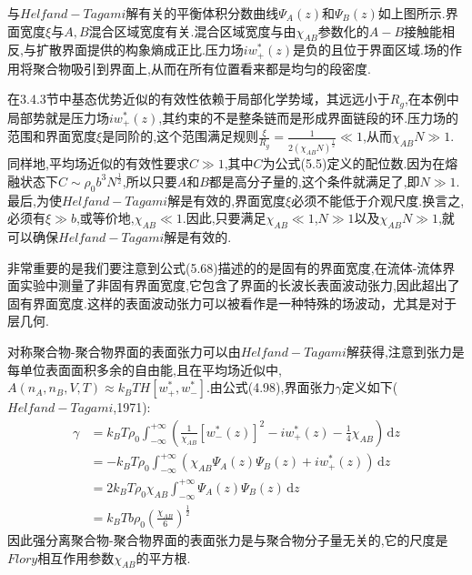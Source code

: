 与$Helfand−Tagami$解有关的平衡体积分数曲线$\Psi_{A}(z)$和$\Psi_{B}(z)$如上图所示.界面宽度$\xi$与$A,B$混合区域宽度有关.混合区域宽度与由$\chi_{AB}$参数化的$A−B$接触能相反,与扩散界面提供的构象熵成正比.压力场$iw_+^*(z)$是负的且位于界面区域.场的作用将聚合物吸引到界面上,从而在所有位置看来都是均匀的段密度.

在3.4.3节中基态优势近似的有效性依赖于局部化学势域，其远远小于$R_g$,在本例中局部势就是压力场$iw_+^*(z)$,其约束的不是整条链而是形成界面链段的环.压力场的范围和界面宽度$\xi$是同阶的,这个范围满足规则$\frac{\xi}{R_g} =\frac{1}{2(\chi_{AB}N)^{\frac{1}{2}}}\ll1$,从而$\chi_{AB}N\gg1$.同样地,平均场近似的有效性要求$C\gg1$,其中$C$为公式(5.5)定义的配位数.因为在熔融状态下$C\sim\rho_0b^3N^{\frac{1}{2}}$,所以只要$A$和$B$都是高分子量的,这个条件就满足了,即$N\gg1$.最后,为使$Helfand−Tagami$解是有效的,界面宽度$\xi $必须不能低于介观尺度.换言之,必须有$\xi \gg b$,或等价地,$\chi_{AB}\ll1$.因此,只要满足$\chi_{AB}\ll1$,$N\gg1$以及$\chi_{AB}N\gg1$,就可以确保$Helfand−Tagami$解是有效的.
	
非常重要的是我们要注意到公式(5.68)描述的的是固有的界面宽度,在流体-流体界面实验中测量了非固有界面宽度,它包含了界面的长波长表面波动张力,因此超出了固有界面宽度.这样的表面波动张力可以被看作是一种特殊的场波动，尤其是对于层几何.

对称聚合物-聚合物界面的表面张力可以由$Helfand−Tagami$解获得,注意到张力是每单位表面面积多余的自由能,且在平均场近似中,$A(n_A,n_B,V,T)\approx k_BTH[w_+^*,w_-^*]$.由公式(4.98),界面张力$\gamma$定义如下($Helfand−Tagami$,1971):
\begin{equation}
\begin{aligned}
\gamma&=k_B T \rho_0\int_{-\infty}^{+\infty}(\frac{1}{\chi_{AB}}[w_-^*(z)]^2-iw_+^*(z)-\frac{1}{4}\chi_{AB})\,\mathrm{d}z\\
&=-k_B T \rho_0\int_{-\infty}^{+\infty}(\chi_{AB}\Psi_{A}(z)\Psi_{B}(z)+iw_+^*(z))\,\mathrm{d}z\\
&=2k_B T \rho_0\chi_{AB}\int_{-\infty}^{+\infty}\Psi_{A}(z)\Psi_{B}(z)\,\mathrm{d}z\\
&=k_B T b \rho_0(\frac{\chi_{AB}}{6})^{\frac{1}{2}}
\end{aligned}
\end{equation}
因此强分离聚合物-聚合物界面的表面张力是与聚合物分子量无关的,它的尺度是$Flory$相互作用参数$\chi_{AB}$的平方根.

